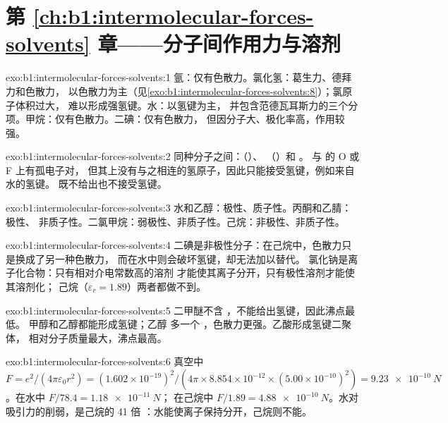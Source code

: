 \section*{第 \ref{ch:b1:intermolecular-forces-solvents} 章——分子间作用力与溶剂}

\begin{solution}{exo:b1:intermolecular-forces-solvents:1}
氩：仅有色散力。氯化氢：葛生力、德拜力和色散力，
以色散力为主（见\cref{exo:b1:intermolecular-forces-solvents:8}）；氯原子体积过大，
难以形成强氢键。水：以氢键为主，
并包含范德瓦耳斯力的三个分项。甲烷：仅有色散力。二碘：仅有色散力，
但因分子大、极化率高，作用较强。
\end{solution}

\begin{solution}{exo:b1:intermolecular-forces-solvents:2}
同种分子之间：（）、
（）和 。 与  的 O 或 F 上有孤电子对，
但其上没有与之相连的氢原子，因此只能接受氢键，例如来自水的氢键。
 既不给出也不接受氢键。
\end{solution}

\begin{solution}{exo:b1:intermolecular-forces-solvents:3}
水和乙醇：极性、质子性。丙酮和乙腈：极性、
非质子性。二氯甲烷：弱极性、非质子性。己烷：非极性、非质子性。
\end{solution}

\begin{solution}{exo:b1:intermolecular-forces-solvents:4}
二碘是非极性分子：在己烷中，色散力只是换成了另一种色散力，
而在水中则会破坏氢键，却无法加以替代。
氯化钠是离子化合物：只有相对介电常数高的溶剂
才能使其离子分开，只有极性溶剂才能使其溶剂化；
己烷（$\varepsilon_r = 1.89$）两者都做不到。
\end{solution}

\begin{solution}{exo:b1:intermolecular-forces-solvents:5}
二甲醚不含 ，不能给出氢键，因此沸点最低。
甲醇和乙醇都能形成氢键；乙醇
多一个 ，色散力更强。乙酸形成氢键二聚体，
相对分子质量最大，沸点最高。
\end{solution}

\begin{solution}{exo:b1:intermolecular-forces-solvents:6}
真空中 $F = e^2/(4\pi\varepsilon_0 r^2) = (1.602 \times
10^{-19})^2/(4\pi \times 8.854 \times 10^{-12} \times (5.00 \times
10^{-10})^2) = \qty{9.23e-10}{N}$。在水中 $F/78.4 = \qty{1.18e-11}{N}$；
在己烷中 $F/1.89 = \qty{4.88e-10}{N}$。水对吸引力的削弱，是己烷的 41 倍
：水能使离子保持分开，己烷则不能。
\end{solution}

